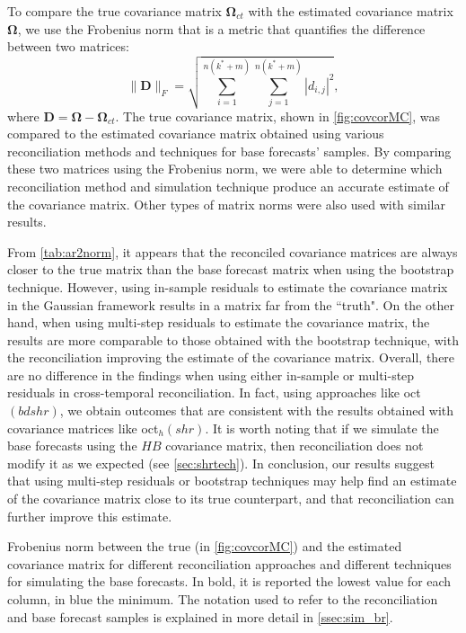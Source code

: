 \documentclass[a4paper,11pt]{article}
\newcommand{\Dvet}{\bm{D}}
\newcommand{\Omegavet}{\bm{\Omega}}
\theoremstyle{definition}
\begin{document}
To compare the true covariance matrix $\Omegavet_{ct}$ with the estimated covariance matrix $\Omegavet$, we use the Frobenius norm that is a metric that quantifies the difference between two matrices:
$$
	\lVert \Dvet \rVert_F = \sqrt{\sum_{i = 1}^{n(k^\ast + m)}\sum_{j = 1}^{n(k^\ast + m)}|d_{i,j}|^2},
$$
where $\Dvet = \Omegavet - \Omegavet_{ct}$. The true covariance matrix, shown in \autoref{fig:covcorMC}, was compared to the estimated covariance matrix obtained using various reconciliation methods and techniques for base forecasts' samples. By comparing these two matrices using the Frobenius norm, we were able to determine which reconciliation method and simulation technique produce an accurate estimate of the covariance matrix. Other types of matrix norms were also used with similar results.

From \autoref{tab:ar2norm}, it appears that the reconciled covariance matrices are always closer to the true matrix than the base forecast matrix when using the bootstrap technique. However, using in-sample residuals to estimate the covariance matrix in the Gaussian framework results in a matrix far from the “truth". On the other hand, when using multi-step residuals to estimate the covariance matrix, the results are more comparable to those obtained with the bootstrap technique, with the reconciliation improving the estimate of the covariance matrix. Overall, there are no difference in the findings when using either in-sample or multi-step residuals in cross-temporal reconciliation. In fact, using approaches like oct$(bdshr)$, we obtain outcomes that are consistent with the results obtained with covariance matrices like oct$_h(shr)$. It is worth noting that if we simulate the base forecasts using the $HB$ covariance matrix, then reconciliation does not modify it as we expected (see \autoref{sec:shrtech}). In conclusion, our results suggest that using multi-step residuals or bootstrap techniques may help find an estimate of the covariance matrix close to its true counterpart, and that reconciliation can further improve this estimate.

\begin{table}[t]
	\centering
	\fontsize{9}{11}\selectfont
	
	\caption{Frobenius norm between the true (in \autoref{fig:covcorMC}) and the estimated covariance matrix for different reconciliation approaches and different techniques for simulating the base forecasts. In bold, it is reported the lowest value for each column, in blue the minimum.  The notation used to refer to the reconciliation and base forecast samples is explained in more detail in \autoref{ssec:sim_br}.}
	\label{tab:ar2norm}
\end{table}
\end{document}
